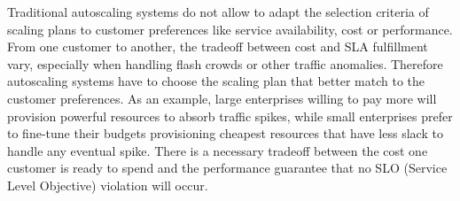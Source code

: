
Traditional autoscaling systems do not allow to adapt the
selection criteria of scaling plans to customer preferences like
service availability, cost or performance. From one customer to
another, the tradeoff between cost and SLA fulfillment vary,
especially when handling flash crowds or other traffic anomalies.
Therefore autoscaling systems have to choose the scaling plan that
better match to the customer preferences. As an example, large
enterprises willing to pay more will provision powerful resources to
absorb traffic spikes, while small enterprises prefer to fine-tune
their budgets provisioning cheapest resources that have less slack to
handle any eventual spike. There is a necessary tradeoff between the
cost one customer is ready to spend and the performance guarantee that
no SLO (Service Level Objective) violation will occur.








